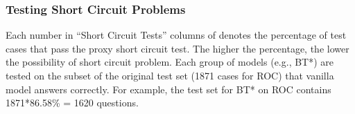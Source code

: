 
\subsubsection{Testing Short Circuit Problems}
\label{sec:fix-sc}
Each number in ``Short Circuit Tests'' columns of
 denotes
the percentage of test cases that pass 
the proxy short circuit test. 
The higher the percentage, the lower the possibility of short circuit problem.
Each group of models (e.g., BT*) are tested
on the subset of the original test set (1871 cases for ROC)
that vanilla model answers correctly.
For example, the test set for BT* on ROC contains 
1871*86.58\% = 1620 questions.

